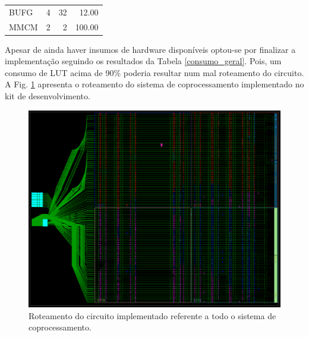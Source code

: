 \begin{table}[!h]
\begin{tabular}{lrrr}
		BUFG                                                          & 4                                                               & 32                                                              & 12.00                                                                \\
		\rowcolor[HTML]{DAE8FC} 
		MMCM                                                          & 2                                                               & 2                                                               & 100.00                                                              
	\end{tabular}
\end{table}

Apesar de ainda haver insumos de hardware disponíveis optou-se por finalizar a implementação seguindo os resultados da Tabela \ref{consumo_geral}. Pois, um consumo de LUT acima de 90\% poderia resultar num mal roteamento do circuito.\\

A Fig. \ref{roteamento} apresenta o roteamento do sistema de coprocessamento implementado no kit de desenvolvimento.

\newpage
\begin{figure}[!h]
	\centering
	\includegraphics[keepaspectratio=true,scale=0.40]{figuras/roteamento.png}
	\caption{Roteamento do circuito implementado referente a todo o sistema de coprocessamento.}
	\label{roteamento}
\end{figure}

